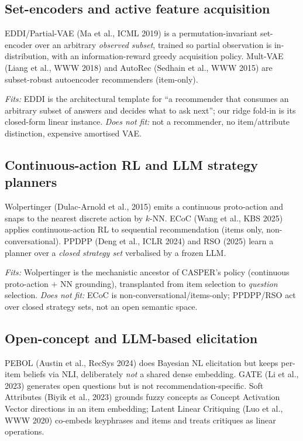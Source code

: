 \subsection{Set-encoders and active feature acquisition}
EDDI/Partial-VAE (Ma et al., ICML 2019) is a permutation-invariant set-encoder over an arbitrary \emph{observed
subset}, trained so partial observation is in-distribution, with an information-reward greedy acquisition policy.
Mult-VAE (Liang et al., WWW 2018) and AutoRec (Sedhain et al., WWW 2015) are subset-robust autoencoder
recommenders (item-only).

\emph{Fits:} EDDI is the architectural template for ``a recommender that consumes an arbitrary subset of answers
and decides what to ask next''; our ridge fold-in is its closed-form linear instance. \emph{Does not fit:} not a
recommender, no item/attribute distinction, expensive amortised VAE.

\subsection{Continuous-action RL and LLM strategy planners}
Wolpertinger (Dulac-Arnold et al., 2015) emits a continuous proto-action and snaps to the nearest discrete action
by $k$-NN. ECoC (Wang et al., KBS 2025) applies continuous-action RL to sequential recommendation (items only,
non-conversational). PPDPP (Deng et al., ICLR 2024) and RSO (2025) learn a planner over a \emph{closed strategy
set} verbalised by a frozen LLM.

\emph{Fits:} Wolpertinger is the mechanistic ancestor of CASPER's policy (continuous proto-action $+$ NN
grounding), transplanted from item selection to \emph{question} selection. \emph{Does not fit:} ECoC is
non-conversational/items-only; PPDPP/RSO act over closed strategy sets, not an open semantic space.

\subsection{Open-concept and LLM-based elicitation}
PEBOL (Austin et al., RecSys 2024) does Bayesian NL elicitation but keeps per-item beliefs via NLI, deliberately
\emph{not} a shared dense embedding. GATE (Li et al., 2023) generates open questions but is not
recommendation-specific. Soft Attributes (Biyik et al., 2023) grounds fuzzy concepts as Concept Activation Vector
directions in an item embedding; Latent Linear Critiquing (Luo et al., WWW 2020) co-embeds keyphrases and items
and treats critiques as linear operations.

